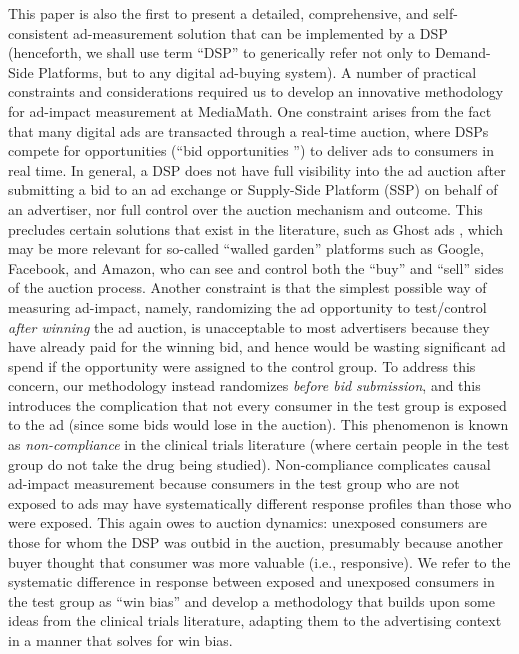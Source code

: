 \documentclass[11pt,a4paper]{article}
\theoremstyle{definition}
\theoremstyle{remark}
\theoremstyle{definition}
\theoremstyle{definition}
\theoremstyle{definition}
\theoremstyle{definition}
\theoremstyle{definition}
\theoremstyle{definition}
\begin{document}
This paper is also the first to present a detailed, comprehensive, and self-consistent ad-measurement solution that can be implemented by a DSP (henceforth, we shall use term “DSP” to generically refer not only to Demand-Side Platforms, but to any digital ad-buying system).
A number of practical constraints and considerations required us to develop an innovative methodology for ad-impact measurement at MediaMath. One constraint arises from the fact that many digital ads are transacted through a real-time auction, where DSPs compete for opportunities (“bid opportunities ”) to deliver ads to consumers in real time. 
In general, a DSP does not have full visibility into the ad auction after submitting a bid to an ad exchange or Supply-Side Platform (SSP) on behalf of an advertiser, nor full control over the auction mechanism and outcome. 
This precludes certain solutions that exist in the literature, such as Ghost ads \cite{Johnson_Ghost_2015}, which may be more relevant for so-called “walled garden” platforms such as Google, Facebook, and Amazon, who can see and control both the “buy” and “sell” sides of the auction process. 
Another constraint is that the simplest possible way of measuring ad-impact, namely, randomizing the ad opportunity to test/control \textit{after winning} the ad auction, is unacceptable to most advertisers because they have already paid for the winning bid, and hence would be wasting significant ad spend if the opportunity were assigned to the control group. 
To address this concern, our methodology instead randomizes \textit{before bid submission}, and this introduces the complication that not every consumer in the test group is exposed to the ad (since some bids would lose in the auction). 
This phenomenon is known as \textit{non-compliance} in the clinical trials literature (where certain people in the test group do not take the drug being studied). 
Non-compliance complicates causal ad-impact measurement because consumers in the test group who are not exposed to ads may have systematically different response profiles than those who were exposed. This again owes to auction dynamics: unexposed consumers are those for whom the DSP was outbid in the auction, presumably because another buyer thought that consumer was more valuable (i.e., responsive). We refer to the systematic difference in response between exposed and unexposed consumers in the test group as “win bias” and develop a methodology that builds upon some ideas from the clinical trials literature, adapting them to the advertising context in a manner that solves for win bias.
\end{document}
